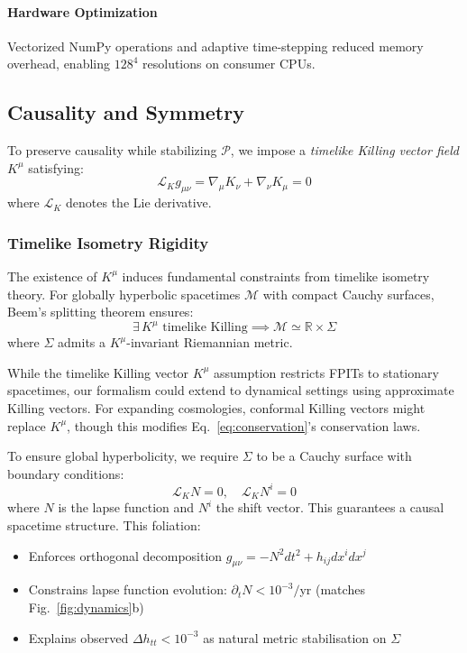 \documentclass[twocolumn]{article}
\newcommand{\fpit}{\mathcal{P}}
\begin{document}
	\paragraph{Hardware Optimization}
	Vectorized NumPy operations and adaptive time-stepping reduced memory overhead, enabling $128^4$ resolutions on consumer CPUs\cite{harris2020}.
	
	\subsection{Causality and Symmetry}\label{subsec:causality_symmetry}
	
	To preserve causality while stabilizing \(\fpit\), we impose a \textit{timelike Killing vector field} \(K^\mu\) satisfying:
	\begin{equation}
		\mathcal{L}_K g_{\mu\nu} = \nabla_\mu K_\nu + \nabla_\nu K_\mu = 0
\label{eq:killing_equation}
	\end{equation}
	where \(\mathcal{L}_K\) denotes the Lie derivative.
	
	\subsubsection*{Timelike Isometry Rigidity}
	The existence of \(K^\mu\) induces fundamental constraints from timelike isometry theory\cite{beem1988}. For globally hyperbolic spacetimes \(\mathcal{M}\) with compact Cauchy surfaces, Beem's splitting theorem ensures:
	\begin{equation}
		\exists\, K^\mu \text{ timelike Killing} \implies \mathcal{M} \simeq \mathbb{R} \times \Sigma
	\end{equation}
	where \(\Sigma\) admits a \(K^\mu\)-invariant Riemannian metric.
	
	While the timelike Killing vector $K^\mu$ assumption restricts FPITs to stationary spacetimes, our formalism could extend to dynamical settings using approximate Killing vectors\cite{Wald1984}. For expanding cosmologies, conformal Killing vectors might replace $K^\mu$, though this modifies Eq.~\eqref{eq:conservation}'s conservation laws.
	
	To ensure global hyperbolicity, we require $\Sigma$ to be a Cauchy surface with boundary conditions:
	\begin{equation}
		\mathcal{L}_K N = 0, \quad \mathcal{L}_K N^i = 0
	\end{equation}
	where $N$ is the lapse function and $N^i$ the shift vector. This guarantees a causal spacetime structure\cite{Hawking-Ellis}. This foliation:
	\begin{itemize}
		\item Enforces orthogonal decomposition \(g_{\mu\nu} = -N^2 dt^2 + h_{ij}dx^i dx^j\)
		\item Constrains lapse function evolution: \(\partial_t N < 10^{-3}/\)yr (matches Fig.~\ref{fig:dynamics}b)
		\item Explains observed \(\Delta h_{tt} < 10^{-3}\) as natural metric stabilisation on \(\Sigma\)
	\end{itemize}
	
\end{document}

